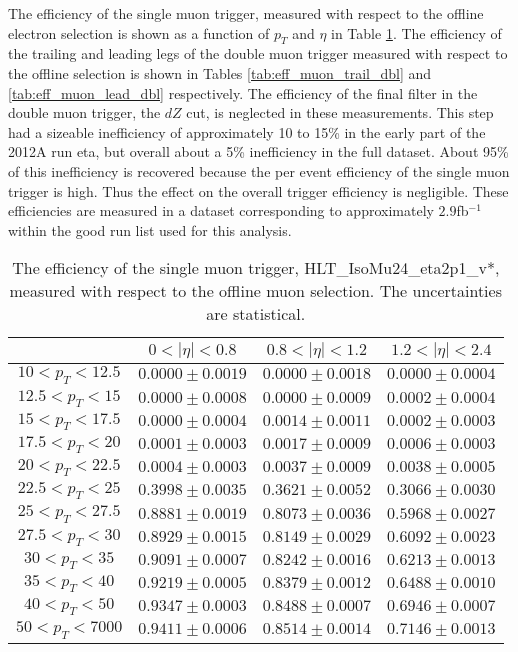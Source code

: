 %
%

The efficiency of the single muon trigger, measured
with respect to the offline electron selection is shown
as a function of $p_T$ and $\eta$ in Table \ref{tab:eff_muon_sgl}.
The efficiency of the trailing and leading legs of the double muon trigger
measured with respect to the offline selection is shown
in Tables \ref{tab:eff_muon_trail_dbl} and \ref{tab:eff_muon_lead_dbl} respectively.
The efficiency of the final filter in the double muon trigger, the $dZ$ cut,
is neglected in these measurements.  This step had a sizeable inefficiency of
approximately 10 to 15\% in the early part of the 2012A run eta, but
overall about a 5\% inefficiency in the full dataset.
About 95\% of this inefficiency is recovered
because the per event efficiency of the single muon trigger is high.
Thus the effect on the overall trigger efficiency is negligible.
These efficiencies are measured in a dataset corresponding
to approximately $2.9$fb$^{-1}$ within the good run list used for this analysis.

\begin{table}[!ht]
\begin{center}
\begin{tabular}{c|c|c|c}
\hline & $0 < |\eta| < 0.8$ & $0.8 < |\eta| < 1.2$ & $1.2 < |\eta| < 2.4$  \\
\hline
$ 10 < p_T < 12.5$ & $0.0000 \pm 0.0019$ & $0.0000 \pm 0.0018$ & $0.0000 \pm 0.0004$  \\
$12.5 < p_T <  15$ & $0.0000 \pm 0.0008$ & $0.0000 \pm 0.0009$ & $0.0002 \pm 0.0004$  \\
$ 15 < p_T < 17.5$ & $0.0000 \pm 0.0004$ & $0.0014 \pm 0.0011$ & $0.0002 \pm 0.0003$  \\
$17.5 < p_T <  20$ & $0.0001 \pm 0.0003$ & $0.0017 \pm 0.0009$ & $0.0006 \pm 0.0003$  \\
$ 20 < p_T < 22.5$ & $0.0004 \pm 0.0003$ & $0.0037 \pm 0.0009$ & $0.0038 \pm 0.0005$  \\
$22.5 < p_T <  25$ & $0.3998 \pm 0.0035$ & $0.3621 \pm 0.0052$ & $0.3066 \pm 0.0030$  \\
$ 25 < p_T < 27.5$ & $0.8881 \pm 0.0019$ & $0.8073 \pm 0.0036$ & $0.5968 \pm 0.0027$  \\
$27.5 < p_T <  30$ & $0.8929 \pm 0.0015$ & $0.8149 \pm 0.0029$ & $0.6092 \pm 0.0023$  \\
$ 30 < p_T <  35$ & $0.9091 \pm 0.0007$ & $0.8242 \pm 0.0016$ & $0.6213 \pm 0.0013$  \\
$ 35 < p_T <  40$ & $0.9219 \pm 0.0005$ & $0.8379 \pm 0.0012$ & $0.6488 \pm 0.0010$  \\
$ 40 < p_T <  50$ & $0.9347 \pm 0.0003$ & $0.8488 \pm 0.0007$ & $0.6946 \pm 0.0007$  \\
$ 50 < p_T < 7000$ & $0.9411 \pm 0.0006$ & $0.8514 \pm 0.0014$ & $0.7146 \pm 0.0013$  \\
\hline
\end{tabular}
\caption{The efficiency of the single muon trigger,
HLT\_IsoMu24\_eta2p1\_v*,
measured with respect to the offline muon selection. 
The uncertainties are statistical.}
\label{tab:eff_muon_sgl}
\end{center}
\end{table}



